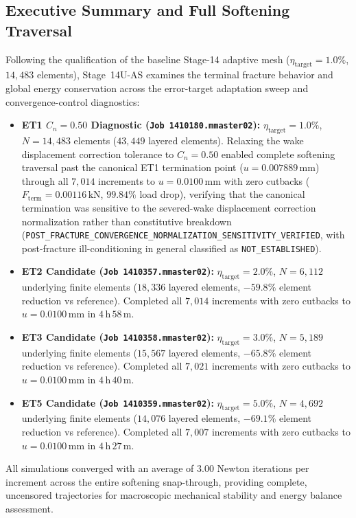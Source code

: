 \subsection{Executive Summary and Full Softening Traversal}
Following the qualification of the baseline Stage-14 adaptive mesh ($\eta_{\mathrm{target}} = 1.0\%$, $14{,}483$ elements), Stage~14U-AS examines the terminal fracture behavior and global energy conservation across the error-target adaptation sweep and convergence-control diagnostics:
\begin{itemize}
  \item \textbf{ET1 $C_n=0.50$ Diagnostic (\texttt{Job 1410180.mmaster02}):} $\eta_{\mathrm{target}} = 1.0\%$, $N = 14{,}483$ elements ($43{,}449$ layered elements). Relaxing the wake displacement correction tolerance to $C_n = 0.50$ enabled complete softening traversal past the canonical ET1 termination point ($u = 0.007889\,\mathrm{mm}$) through all $7{,}014$ increments to $u = 0.0100\,\mathrm{mm}$ with zero cutbacks ($F_{\mathrm{term}} = 0.00116\,\mathrm{kN}$, $99.84\%$ load drop), verifying that the canonical termination was sensitive to the severed-wake displacement correction normalization rather than constitutive breakdown (\texttt{POST\_FRACTURE\_}\allowbreak\texttt{CONVERGENCE\_}\allowbreak\texttt{NORMALIZATION\_}\allowbreak\texttt{SENSITIVITY\_}\allowbreak\texttt{VERIFIED}, with post-fracture ill-conditioning in general classified as \texttt{NOT\_ESTABLISHED}).
  \item \textbf{ET2 Candidate (\texttt{Job 1410357.mmaster02}):} $\eta_{\mathrm{target}} = 2.0\%$, $N = 6{,}112$ underlying finite elements ($18{,}336$ layered elements, $-59.8\%$ element reduction vs reference). Completed all $7{,}014$ increments with zero cutbacks to $u = 0.0100\,\mathrm{mm}$ in $4\,\mathrm{h}\,58\,\mathrm{m}$.
  \item \textbf{ET3 Candidate (\texttt{Job 1410358.mmaster02}):} $\eta_{\mathrm{target}} = 3.0\%$, $N = 5{,}189$ underlying finite elements ($15{,}567$ layered elements, $-65.8\%$ element reduction vs reference). Completed all $7{,}021$ increments with zero cutbacks to $u = 0.0100\,\mathrm{mm}$ in $4\,\mathrm{h}\,40\,\mathrm{m}$.
  \item \textbf{ET5 Candidate (\texttt{Job 1410359.mmaster02}):} $\eta_{\mathrm{target}} = 5.0\%$, $N = 4{,}692$ underlying finite elements ($14{,}076$ layered elements, $-69.1\%$ element reduction vs reference). Completed all $7{,}007$ increments with zero cutbacks to $u = 0.0100\,\mathrm{mm}$ in $4\,\mathrm{h}\,27\,\mathrm{m}$.
\end{itemize}
All simulations converged with an average of $3.00$ Newton iterations per increment across the entire softening snap-through, providing complete, uncensored trajectories for macroscopic mechanical stability and energy balance assessment.

